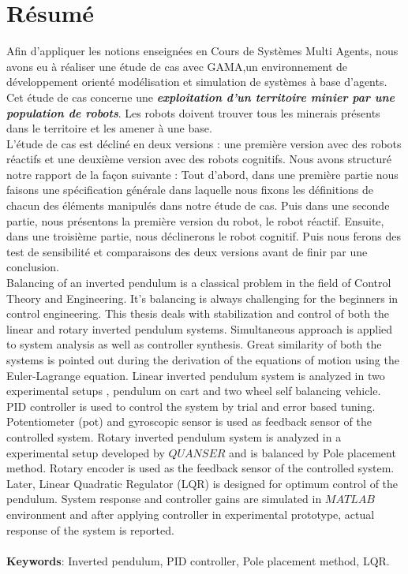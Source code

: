 
\chapter*{Résumé}
Afin d’appliquer les notions enseignées en Cours de Systèmes Multi Agents, nous avons eu à réaliser une étude de cas avec GAMA,un environnement de développement orienté modélisation et simulation de systèmes à base d'agents. Cet étude de cas concerne une \textbf{\textit{exploitation d'un territoire minier par une population de robots}}. Les robots doivent trouver tous les minerais présents dans le territoire et les amener à une base.\\
L'étude de cas est décliné en deux versions : une première version avec des robots réactifs et une deuxième version avec des robots cognitifs. Nous avons structuré notre rapport de la façon suivante :
Tout d'abord, dans une première partie nous faisons une spécification générale dans laquelle nous fixons les définitions de chacun des éléments manipulés dans notre étude de cas. Puis dans une seconde partie, nous présentons la première version du robot, le robot réactif. Ensuite, dans une troisième partie, nous déclinerons le robot cognitif. Puis nous ferons des test de sensibilité et comparaisons des deux versions avant de finir par une conclusion. \\
Balancing of an inverted pendulum is a classical problem in the field of Control Theory and Engineering. It's balancing is always challenging for the beginners in control engineering. This thesis deals with stabilization and control of both the linear and rotary inverted pendulum  systems. Simultaneous approach is applied to system analysis as well as controller synthesis. Great similarity of both the systems is pointed out during the derivation of the equations of motion using the Euler-Lagrange equation. Linear inverted pendulum system is analyzed in two experimental setups , pendulum on cart and two wheel self balancing vehicle. PID controller is used to control the system by trial and error based tuning. Potentiometer (pot) and gyroscopic sensor is used as feedback sensor of the controlled system. Rotary inverted pendulum system is analyzed in a experimental setup developed by $QUANSER$ and is balanced by Pole placement method. Rotary encoder is used as the feedback sensor of the controlled system. Later, Linear Quadratic Regulator (LQR) is designed for optimum control of the pendulum. System response and controller gains are simulated in $MATLAB$ environment and after applying controller in experimental prototype, actual response of the system is reported. \\ 
\\ \textbf{Keywords}: Inverted pendulum,  PID controller, Pole placement method, LQR.
\clearpage
